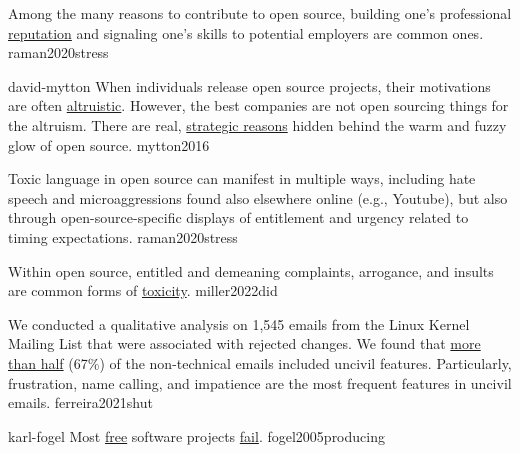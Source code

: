 \documentclass{article}
\begin{document}


  {Among the many reasons to contribute to open source, building one's professional \ul{reputation} and signaling one's skills to potential employers are common ones.}
  {raman2020stress}

\qte
  {david-mytton}
  {When individuals release open source projects, their motivations are often \ul{altruistic}. However, the best companies are not open sourcing things for the altruism. There are real, \ul{strategic reasons} hidden behind the warm and fuzzy glow of open source.}
  {mytton2016}


  {Toxic language in open source can manifest in multiple ways, including hate speech and microaggressions found also elsewhere online (e.g., Youtube), but also through open-source-specific displays of entitlement and urgency related to timing expectations.}
  {raman2020stress}

  {Within open source, entitled and demeaning complaints, arrogance, and insults are common forms of \ul{toxicity}.}
  {miller2022did}

  {We conducted a qualitative analysis on 1,545 emails from the Linux Kernel Mailing List that were associated with rejected changes. We found that \ul{more than half} (67\%) of the non-technical emails included uncivil features. Particularly, frustration, name calling, and impatience are the most frequent features in uncivil emails. }
  {ferreira2021shut}

\qte
  {karl-fogel}
  {Most \ul{free} software projects \ul{fail}.}
  {fogel2005producing}

\end{document}
